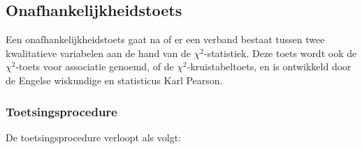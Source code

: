 \subsection{Onafhankelijkheidstoets}
\label{ssec:onafhankelijkheidstoets}

Een onafhankelijkheidstoets gaat na of er een verband bestaat tussen twee kwalitatieve variabelen aan de hand van de $\chi^2$-statistiek. Deze toets wordt ook de $\chi^2$-toets voor associatie genoemd, of de $\chi^2$-kruistabeltoets, en is ontwikkeld door de Engelse wiskundige en statisticus Karl Pearson.

\subsubsection{Toetsingsprocedure}

De toetsingsprocedure verloopt als volgt:

